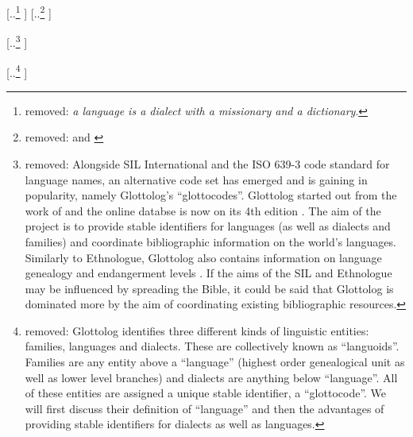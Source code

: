 \documentclass[unnumsec,webpdf,modern,medium]{oup-authoring-template}
\providecommand{\DIFdeltex}[1]{{\protect\color{red} [..\footnote{removed: #1} ]}} %
\providecommand{\DIFdelbegin}{} %
\providecommand{\DIFdel}[1]{\texorpdfstring{\DIFdeltex{#1}}{}} %
\newcommand{\DIFscaledelfig}{0.5}
\newlength{\DIFdelgraphicswidth} %
\newlength{\DIFdelgraphicsheight} %
\newcommand{\DIFdelincludegraphics}[2][]{%
\sbox{\DIFdelgraphicsbox}{\DIFOincludegraphics[#1]{#2}}%
\settoboxwidth{\DIFdelgraphicswidth}{\DIFdelgraphicsbox} %
\settoboxtotalheight{\DIFdelgraphicsheight}{\DIFdelgraphicsbox} %
\scalebox{\DIFscaledelfig}{%
\parbox[b]{\DIFdelgraphicswidth}{\usebox{\DIFdelgraphicsbox}\\[-\baselineskip] \rule{\DIFdelgraphicswidth}{0em}}\llap{\resizebox{\DIFdelgraphicswidth}{\DIFdelgraphicsheight}{%
\setlength{\unitlength}{\DIFdelgraphicswidth}%
\begin{picture}(1,1)%
\thicklines\linethickness{2pt} %
{\color[rgb]{1,0,0}\put(0,0){\framebox(1,1){}}}%
{\color[rgb]{1,0,0}\put(0,0){\line( 1,1){1}}}%
{\color[rgb]{1,0,0}\put(0,1){\line(1,-1){1}}}%
\end{picture}%
}\hspace*{3pt}}} %
} %
\DeclareRobustCommand{\DIFdelbegin}{\DIFOdelbegin \let\includegraphics\DIFdelincludegraphics} %
\begin{document}
\DIFdelbegin %
\DIFdel{\emph{a language is a dialect with a missionary and a dictionary}. }%
\DIFdel{\citet{lupkestorch2013} and \citet{blommaert2008artefactual}
}%


\DIFdel{Alongside SIL International and the ISO 639-3 code standard for language names, an alternative code set has emerged and is gaining in popularity, namely Glottolog's ``glottocodes''.
Glottolog started out from the work of \citet{nordhoff2011glottolog} and the online databse is now on its 4th edition \citep{glottolog40}. The aim of the project is to provide stable identifiers for languages (as well as dialects and families) and coordinate bibliographic information on the world's languages. Similarly to Ethnologue, Glottolog also contains information on language genealogy and endangerment levels \citep{hammarstrom2018simultaneous}. If the aims of the SIL and Ethnologue may be influenced by spreading the Bible, it could be said that Glottolog is dominated more by the aim of coordinating existing bibliographic resources.
}%

\DIFdel{Glottolog identifies three different kinds of linguistic entities: families, languages and dialects. These are collectively known as ``languoids''. Families are any entity above a ``language'' (highest order genealogical unit as well as lower level branches) and dialects are anything below ``language''. All of these entities are assigned a unique stable identifier, a ``glottocode''. We will first discuss their definition of ``language'' and then the advantages of providing stable identifiers for dialects as well as languages. }%
\end{document}
